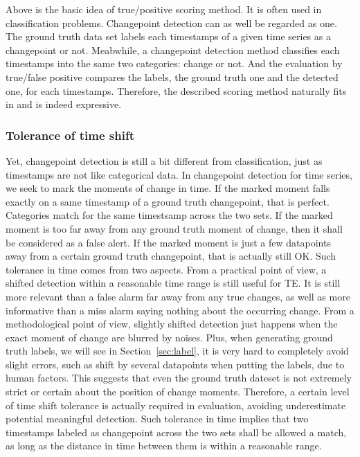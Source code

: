 Above is the basic idea of true/positive scoring method.
It is often used in classification problems.
Changepoint detection can as well be regarded as one.
The ground truth data set labels each timestamps of a given time series as a changepoint or not.
Meabwhile, a changepoint detection method classifies each timestamps into the same two categories: change or not.
And the evaluation by true/false positive compares the labels, the ground truth one and the detected one, for each timestamps. 
Therefore, the described scoring method naturally fits in and is indeed expressive.

\subsubsection{Tolerance of time shift}
Yet, changepoint detection is still a bit different from classification, just as timestamps are not like categorical data.
In changepoint detection for time series, we seek to mark the moments of change in time. 
If the marked moment falls exactly on a same timestamp of a ground truth changepoint, that is perfect. Categories match for the same timestsamp across the two sets.
If the marked moment is too far away from any ground truth moment of change, then it shall be considered as a false alert.
If the marked moment is just a few datapoints away from a certain ground truth changepoint, that is actually still OK.
Such tolerance in time comes from two aspects.
From a practical point of view, a shifted detection within a reasonable time range is still useful for TE.
It is still more relevant than a false alarm far away from any true changes, as well as more informative than a miss alarm saying nothing about the occurring change.
From a methodological point of view, slightly shifted detection just happens when  the exact moment of change are blurred by noises.
Plus, when generating ground truth labels, we will see in Section~\ref{sec:label}, it is very hard to completely avoid slight errors, such as shift by several datapoints when putting the labels, due to human factors.
This suggests that even the ground truth dateset is not extremely strict or certain about the position of change moments.
Therefore, a certain level of time shift tolerance is actually required in evaluation, avoiding underestimate potential meaningful detection.
Such tolerance in time implies that two timestamps labeled as changepoint across the two sets shall be allowed a match, as long as the distance in time between them is within a reasonable range.

